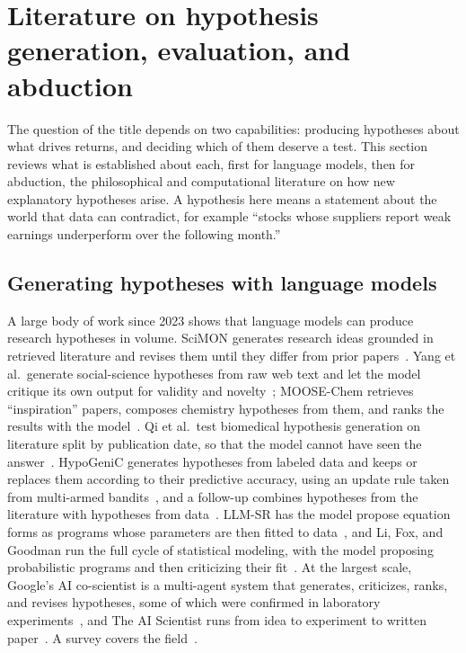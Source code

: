 \documentclass[11pt]{article}
\begin{document}
\section{Literature on hypothesis generation, evaluation, and abduction}
\label{sec:litreview}

The question of the title depends on two capabilities: producing hypotheses about what drives returns,
and deciding which of them deserve a test. This section reviews what is established about each, first
for language models, then for abduction, the philosophical and computational literature on how new
explanatory hypotheses arise. A hypothesis here means a statement about the world that data can
contradict, for example ``stocks whose suppliers report weak earnings underperform over the following
month.''

\subsection{Generating hypotheses with language models}

A large body of work since 2023 shows that language models can produce research hypotheses in volume.
SciMON generates research ideas grounded in retrieved literature and revises them until they differ
from prior papers~\cite{scimon}. Yang et al.\ generate social-science hypotheses from raw web text and
let the model critique its own output for validity and novelty~\cite{yangopen}; MOOSE-Chem retrieves
``inspiration'' papers, composes chemistry hypotheses from them, and ranks the results with the
model~\cite{moosechem}. Qi et al.\ test biomedical hypothesis generation on literature split by
publication date, so that the model cannot have seen the answer~\cite{qi2023,qi2024}. HypoGeniC generates
hypotheses from labeled data and keeps or replaces them according to their predictive accuracy, using an
update rule taken from multi-armed bandits~\cite{hypogenic}, and a follow-up combines hypotheses from
the literature with hypotheses from data~\cite{litdata}. LLM-SR has the model propose equation forms as
programs whose parameters are then fitted to data~\cite{llmsr}, and Li, Fox, and Goodman run the full
cycle of statistical modeling, with the model proposing probabilistic programs and then criticizing
their fit~\cite{boxloop}. At the largest scale, Google's AI co-scientist is a multi-agent system that
generates, criticizes, ranks, and revises hypotheses, some of which were confirmed in laboratory
experiments~\cite{coscientist}, and The AI Scientist runs from idea to experiment to written
paper~\cite{aiscientist}. A survey covers the field~\cite{hypsurvey}.
\end{document}
